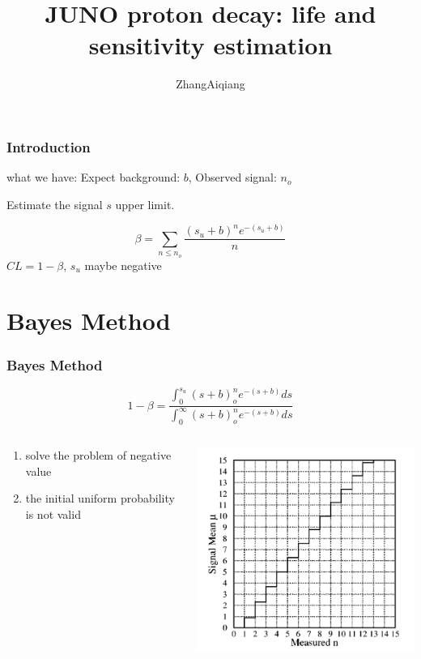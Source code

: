 \documentclass[aspectratio=1610,brown]{beamer}
\title{JUNO proton decay: life and sensitivity estimation}
\author{ZhangAiqiang}
\institute{DEP}
\date{}
\begin{document}
\begin{frame}
    \titlepage
\end{frame}
\begin{frame}
    \frametitle{Introduction}
    what we have: Expect background: $b$, Observed signal: $n_o$

    Estimate the signal $s$ upper limit.

    \[\beta=\sum_{n\leq n_o}{\frac{(s_u+b)^ne^{-(s_u+b)}}{n}}\] 
    $CL=1-\beta$, $s_u$ maybe negative
\end{frame}
\section{Bayes Method}
\begin{frame}
    \frametitle{Bayes Method}
    \[1-\beta=\frac{\int_0^{s_u}{(s+b)^n_oe^{-(s+b)}ds}}{\int_0^{\infty}{(s+b)^n_oe^{-(s+b)}ds}}\]
    \begin{columns}
        \begin{column}{0.5\textwidth}
            \begin{enumerate}
                \item solve the problem of negative value
                \item the initial uniform probability is not valid
            \end{enumerate}
        \end{column}
        \begin{column}{0.5\textwidth}
            \includegraphics[width=\columnwidth]{figure/bayes.png}
        \end{column}
    \end{columns}
\end{frame}
\end{document}
